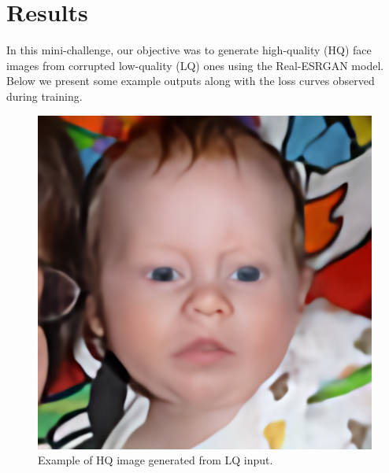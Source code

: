 \section{Results}
\label{sec:results} %

In this mini-challenge, our objective was to generate high-quality (HQ) face images from corrupted low-quality (LQ) ones using the Real-ESRGAN model. Below we present some example outputs along with the loss curves observed during training.

\begin{figure}[htbp]
    \centering
    \begin{minipage}{0.45\textwidth}
        \centering
        \includegraphics[width=\textwidth]{imgs/output_00328.png}
        \caption{Example of HQ image generated from LQ input.}
        \label{fig:image1}
    \end{minipage}\hfill
    \begin{minipage}{0.45\textwidth}
        \centering

\end{minipage}
\end{figure}
